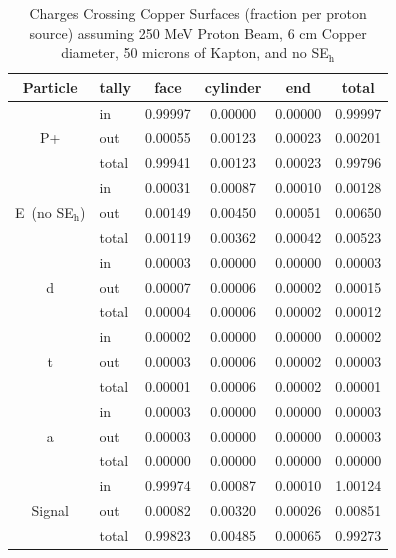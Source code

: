 \documentclass{mc2015}
\begin{document}
\begin{table}[H]
  \centering
  \caption{Charges Crossing Copper Surfaces (fraction per proton source) assuming 250 MeV Proton Beam, 6 cm Copper diameter, 50 microns of Kapton, and no SE$_\text{h}$}
  \begin{tabular}{clcccc}
    \toprule
    Particle & tally & face & cylinder & end & total \\
    \midrule
       & in & \num{0.99997} & \num{0.00000} & \num{0.00000} & \num{0.99997} \\
    P+ & out & \num{0.00055} & \num{0.00123} & \num{0.00023} & \num{0.00201} \\
       & total & \num{0.99941} & \num{0.00123} & \num{0.00023} & \num{0.99796} \\
    \midrule
       & in & \num{0.00031} & \num{0.00087} & \num{0.00010} & \num{0.00128} \\
    E\ (no SE$_\text{h}$) & out & \num{0.00149} & \num{0.00450} & \num{0.00051} & \num{0.00650} \\
       & total & \num{0.00119} & \num{0.00362} & \num{0.00042} & \num{0.00523} \\
    \midrule
       & in & \num{0.00003} & \num{0.00000} & \num{0.00000} & \num{0.00003} \\
     d & out & \num{0.00007} & \num{0.00006} & \num{0.00002} & \num{0.00015} \\
       & total & \num{0.00004} & \num{0.00006} & \num{0.00002} & \num{0.00012} \\
    \midrule
       & in & \num{0.00002} & \num{0.00000} & \num{0.00000} & \num{0.00002} \\
     t & out & \num{0.00003} & \num{0.00006} & \num{0.00002} & \num{0.00003} \\
       & total & \num{0.00001} & \num{0.00006} & \num{0.00002} & \num{0.00001} \\
    \midrule
       & in & \num{0.00003} & \num{0.00000} & \num{0.00000} & \num{0.00003} \\
     a & out & \num{0.00003} & \num{0.00000} & \num{0.00000} & \num{0.00003} \\
       & total & \num{0.00000} & \num{0.00000} & \num{0.00000} & \num{0.00000} \\
    \midrule
       & in & \num{0.99974} & \num{0.00087} & \num{0.00010} & \num{1.00124} \\
    Signal & out & \num{0.00082} & \num{0.00320} & \num{0.00026} & \num{0.00851} \\
       & total & \num{0.99823} & \num{0.00485} & \num{0.00065} & \num{0.99273} \\
    \bottomrule
  \end{tabular}
  \label{tab:mcnp_charge_crossing}
\end{table}
\end{document}
